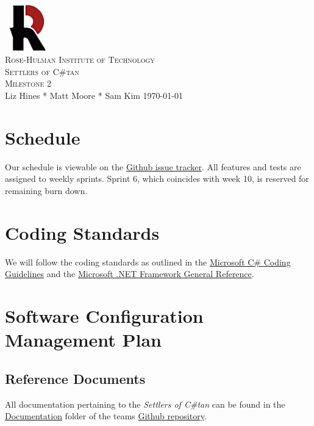 \documentclass[12pt]{article}
\begin{document}
\begin{titlepage}
\begin{center}
\includegraphics[width=0.15\textwidth]{Images/logo}\\[1cm]
\textsc{\LARGE Rose-Hulman Institute of Technology}\\[1.5cm]
\textsc{\Large Settlers of C\#tan}\\[1.0cm]
\textsc{\Large Milestone 2}\\[1.0cm]
\Large Liz Hines \hspace{0.2cm}*\hspace{0.2cm}  Matt Moore \hspace{0.2cm}*\hspace{0.2cm} Sam	Kim
\vfill
\large \today
\end{center}
\end{titlepage}

\newpage
{\small \tableofcontents}
\newpage

\section{Schedule}
Our schedule is viewable on the \href{https://github.com/mooremo/Settlers-of-Catan/issues/milestones}{Github issue tracker}. All features and tests are assigned to weekly sprints. Sprint 6, which coincides with week 10, is reserved for remaining burn down.

\section{Coding Standards}
We will follow the coding standards as outlined in the \href{http://goo.gl/XRoHg}{Microsoft C\# Coding Guidelines} and the \href{http://goo.gl/kuwHu}{Microsoft .NET Framework General Reference}.

\section{Software Configuration Management Plan}
\subsection{Reference Documents}
All documentation pertaining to the \emph{Settlers of C\#tan} can be found in the \href{https://github.com/mooremo/Settlers-of-Catan/tree/master/Documentation}{Documentation} folder of the teams \href{https://github.com/mooremo/Settlers-of-Catan}{Github repository}.
\end{document}
